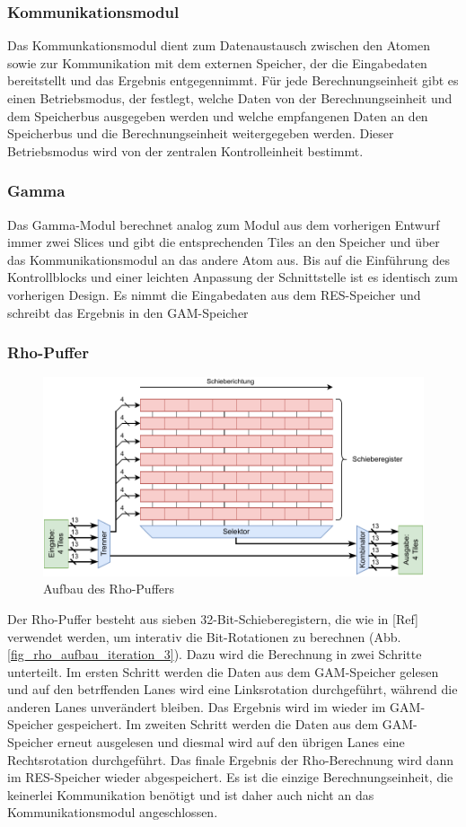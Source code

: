 \subsubsection{Kommunikationsmodul}
Das Kommunkationsmodul dient zum Datenaustausch zwischen den Atomen sowie zur Kommunikation mit dem externen Speicher, der die Eingabedaten bereitstellt und das Ergebnis entgegennimmt.
Für jede Berechnungseinheit gibt es einen Betriebsmodus, der festlegt, welche Daten von der Berechnungseinheit und dem Speicherbus ausgegeben werden und welche empfangenen Daten an den Speicherbus und die Berechnungseinheit
weitergegeben werden. Dieser Betriebsmodus wird von der zentralen Kontrolleinheit bestimmt.

\subsubsection{Gamma}
Das Gamma-Modul berechnet analog zum Modul aus dem vorherigen Entwurf immer zwei Slices und gibt die entsprechenden Tiles an den Speicher und über das Kommunikationsmodul an das andere Atom aus.
Bis auf die Einführung des Kontrollblocks und einer leichten Anpassung der Schnittstelle ist es identisch zum vorherigen Design. Es nimmt die Eingabedaten aus dem RES-Speicher und schreibt das Ergebnis in den GAM-Speicher

\subsubsection{Rho-Puffer}
\begin{figure}
	\center
	\includegraphics{images/Rho-Aufbau.pdf}
	\caption{Aufbau des Rho-Puffers}
	\label{fig:rho_aufbau_iteration_3}
\end{figure}
Der Rho-Puffer besteht aus sieben 32-Bit-Schieberegistern, die wie in [Ref] verwendet werden, um interativ die Bit-Rotationen zu berechnen (Abb. \ref{fig_rho_aufbau_iteration_3}).
Dazu wird die Berechnung in zwei Schritte unterteilt. Im ersten Schritt werden die Daten aus dem GAM-Speicher gelesen und auf den betrffenden Lanes wird eine Linksrotation durchgeführt, während die anderen Lanes unverändert bleiben.
Das Ergebnis wird im wieder im GAM-Speicher gespeichert. Im zweiten Schritt werden die Daten aus dem GAM-Speicher erneut ausgelesen und diesmal wird auf den übrigen Lanes eine Rechtsrotation durchgeführt. Das finale Ergebnis der Rho-Berechnung
wird dann im RES-Speicher wieder abgespeichert. Es ist die einzige Berechnungseinheit, die keinerlei Kommunikation benötigt und ist daher auch nicht an das Kommunikationsmodul angeschlossen.

